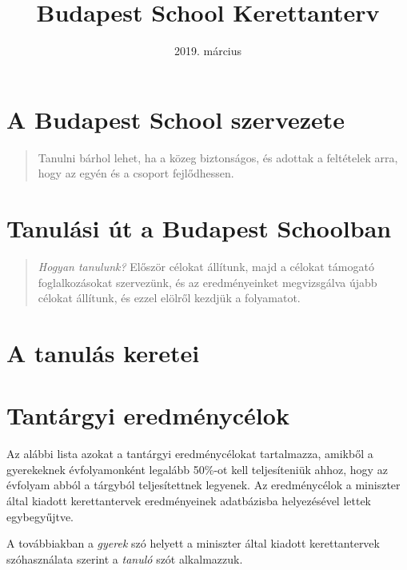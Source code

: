 \documentclass[magyar,12pt,a4paper,oneside,draf]{report}
\begin{document}
\newif\ifkerettanterv
\kerettantervtrue

\title{Budapest School Kerettanterv}
\author{}
\date{2019. m\'arcius}
\maketitle

\tableofcontents
\newpage


\chapter{A Budapest School szervezete}
  \begin{quote}
    Tanulni bárhol lehet, ha a közeg biztonságos, és adottak a feltételek arra,
    hogy az egyén és a csoport fejlődhessen.
  \end{quote}


\chapter{Tanulási út a Budapest Schoolban}
\begin{quote}
\emph{Hogyan tanulunk?}
Először célokat állítunk, majd a célokat támogató
foglalkozásokat szervezünk, és az eredményeinket megvizsgálva újabb
célokat állítunk, és ezzel elölről kezdjük a folyamatot.
\end{quote}



\chapter{A tanulás keretei}


\chapter{Tantárgyi eredménycélok}
\label{sec:tantargyi_celok}
Az alábbi lista azokat a tantárgyi eredménycélokat tartalmazza, amikből a gyerekeknek évfolyamonként legalább 50\%-ot kell teljesíteniük ahhoz, hogy az évfolyam abból a tárgyból teljesítettnek legyenek. Az eredménycélok a miniszter által kiadott kerettantervek\cite{ofi:kerettanterv}  eredményeinek adatbázisba helyezésével lettek egybegyűjtve.

A továbbiakban a \emph{gyerek} szó helyett a miniszter által kiadott kerettantervek szóhasználata szerint a \emph{tanuló} szót alkalmazzuk.


{}
\label{sec:bibliographyk}

\end{document}
